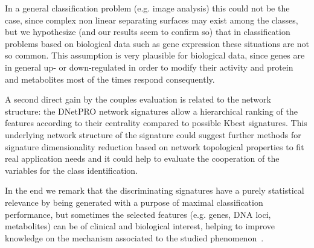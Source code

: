 \documentclass{standalone}
\begin{document}
In a general classification problem (e.g. image analysis) this could not be the case, since complex non linear separating surfaces may exist among the classes, but we hypothesize (and our results seem to confirm so) that in classification problems based on biological data such as gene expression these situations are not so common.
This assumption is very plausible for biological data, since genes are in general up- or down-regulated in order to modify their activity and protein and metabolites most of the times respond consequently.

A second direct gain by the couples evaluation is related to the network structure: the \textsf{DNetPRO} network signatures allow a hierarchical ranking of the features according to their centrality compared to possible Kbest signatures.
This underlying network structure of the signature could suggest further methods for signature dimensionality reduction based on network topological properties to fit real application needs and it could help to evaluate the cooperation of the variables for the class identification.

In the end we remark that the discriminating signatures have a purely statistical relevance by being generated with a purpose of maximal classification performance, but sometimes the selected features (e.g. genes, DNA loci, metabolites) can be of clinical and biological interest, helping to improve knowledge on the mechanism associated to the studied phenomenon~\cite{PMrna, Scotlandi2009, PMgene, Terragna}.
\end{document}
